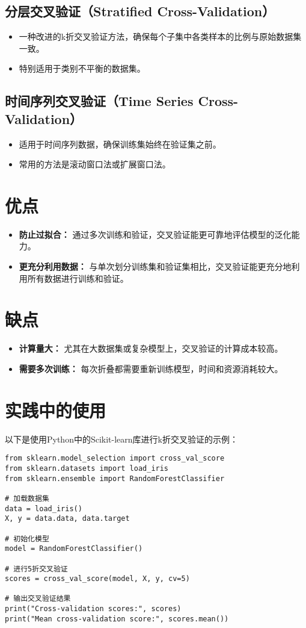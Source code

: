 \documentclass{article}
\begin{document}
\subsection{分层交叉验证（Stratified Cross-Validation）}
\begin{itemize}
  \item 一种改进的k折交叉验证方法，确保每个子集中各类样本的比例与原始数据集一致。
  \item 特别适用于类别不平衡的数据集。
\end{itemize}

\subsection{时间序列交叉验证（Time Series Cross-Validation）}
\begin{itemize}
  \item 适用于时间序列数据，确保训练集始终在验证集之前。
  \item 常用的方法是滚动窗口法或扩展窗口法。
\end{itemize}

\section{优点}
\begin{itemize}
  \item \textbf{防止过拟合：} 通过多次训练和验证，交叉验证能更可靠地评估模型的泛化能力。
  \item \textbf{更充分利用数据：} 与单次划分训练集和验证集相比，交叉验证能更充分地利用所有数据进行训练和验证。
\end{itemize}

\section{缺点}
\begin{itemize}
  \item \textbf{计算量大：} 尤其在大数据集或复杂模型上，交叉验证的计算成本较高。
  \item \textbf{需要多次训练：} 每次折叠都需要重新训练模型，时间和资源消耗较大。
\end{itemize}

\section{实践中的使用}
以下是使用Python中的Scikit-learn库进行k折交叉验证的示例：

\begin{verbatim}
from sklearn.model_selection import cross_val_score
from sklearn.datasets import load_iris
from sklearn.ensemble import RandomForestClassifier

# 加载数据集
data = load_iris()
X, y = data.data, data.target

# 初始化模型
model = RandomForestClassifier()

# 进行5折交叉验证
scores = cross_val_score(model, X, y, cv=5)

# 输出交叉验证结果
print("Cross-validation scores:", scores)
print("Mean cross-validation score:", scores.mean())
\end{verbatim}
\end{document}
